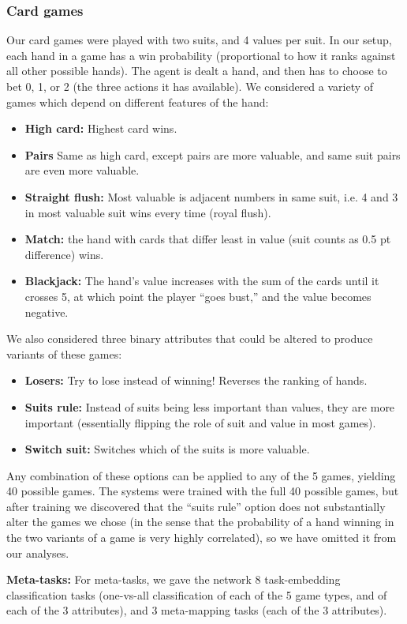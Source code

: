 \documentclass{article}
\begin{document}
\subsubsection{Card games}
\label{meth_data_cards}
Our card games were played with two suits, and 4 values per suit. In our setup, each hand in a game has a win probability (proportional to how it ranks against all other possible hands). The agent is dealt a hand, and then has to choose to bet 0, 1, or 2 (the three actions it has available). We considered a variety of games which depend on different features of the hand: 
\begin{itemize}
\item \textbf{High card:} Highest card wins.
\item \textbf{Pairs} Same as high card, except pairs are more valuable, and same suit pairs are even more valuable.
\item \textbf{Straight flush:} Most valuable is adjacent numbers in same suit, i.e. 4 and 3 in most valuable suit wins every time (royal flush).
\item \textbf{Match:} the hand with cards that differ least in value (suit counts as 0.5 pt difference) wins.
\item \textbf{Blackjack:} The hand's value increases with the sum of the cards until it crosses 5, at which point the player ``goes bust,'' and the value becomes negative. 
\end{itemize}
We also considered three binary attributes that could be altered to produce variants of these games:
\begin{itemize}
\item \textbf{Losers:} Try to lose instead of winning! Reverses the ranking of hands.
\item \textbf{Suits rule:} Instead of suits being less important than values, they are more important (essentially flipping the role of suit and value in most games).
\item \textbf{Switch suit:} Switches which of the suits is more valuable.
\end{itemize}
Any combination of these options can be applied to any of the 5 games, yielding 40 possible games. The systems were trained with the full 40 possible games, but after training we discovered that the ``suits rule'' option does not substantially alter the games we chose (in the sense that the probability of a hand winning in the two variants of a game is very highly correlated), so we have omitted it from our analyses.\par
\textbf{Meta-tasks:} For meta-tasks, we gave the network 8 task-embedding classification tasks (one-vs-all classification of each of the 5 game types, and of each of the 3 attributes), and 3 meta-mapping tasks (each of the 3 attributes).
\end{document}
